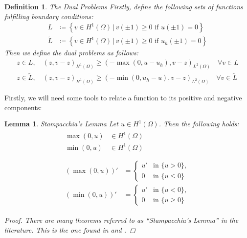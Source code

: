 \documentclass[headsepline,footsepline,footinclude=false,oneside,fontsize=11pt,paper=a4,listof=totoc,bibliography=totoc]{scrbook} %
\newtheorem{lemma}{Lemma}
\newtheorem{definition}{Definition}
\begin{document}
\begin{definition} The Dual Problems \newline
	Firstly, define the following sets of functions fulfilling boundary conditions:
	\begin{align*}
	L &\coloneqq \left\{ v \in H^1(\Omega) \,|\, v(\pm 1) \geq 0 \,\,\text{if}\,\, u(\pm 1) = 0 \right\} \\
	\tilde{L} &\coloneqq \left\{ v \in H^1(\Omega) \,|\, v(\pm 1) \geq 0 \,\,\text{if}\,\, u_h(\pm 1) = 0 \right\}
	\end{align*} 
	Then we define the dual problems as follows:
	\begin{align} 
		z \in L,\quad (z,v-z)_{H^1(\Omega)} \geq (-\max(0,u-u_h),v-z)_{L^2(\Omega)} \quad \forall v \in L \label{eq:dual_variational_inequality} \\
		z \in \tilde{L},\quad (z,v-z)_{H^1(\Omega)} \geq (-\min(0,u_h-u),v-z)_{L^2(\Omega)} \quad \forall v \in \tilde{L}
	\end{align}
\end{definition}

Firstly, we will need some tools to relate a function to its positive and negative components:

\begin{lemma} Stampacchia's Lemma \newline
	Let $u \in H^1(\Omega)$. Then the following holds:
	\begin{align}
	\begin{split} \label{eq:stampacchia_H1}
	\max(0,u) &\in H^1(\Omega) \\
	\min(0,u) &\in H^1(\Omega)
	\end{split} \\
	\nonumber \\ 
	\begin{split} \label{eq:stampacchia_derivative}
	\left(\max(0,u)\right)' &= \begin{cases}
	u' &\text{in}\,\, \{u > 0\}, \\
	0  &\text{in}\,\, \{u \leq 0\}
	\end{cases} \\
	\left(\min(0,u)\right)' &= \begin{cases}
	u' &\text{in}\,\, \{u < 0\}, \\
	0  &\text{in}\,\, \{u \geq 0\}
	\end{cases}
	\end{split}
	\end{align}
	\begin{proof}
		There are many theorems referred to as ``Stampacchia's Lemma'' in the literature. This is the one found in \cite[Theorem A.1]{KinderlehrerStampacchia} and \cite[Theorem 5.8.2]{Attouch09}.
	\end{proof}
\end{lemma}
\end{document}
